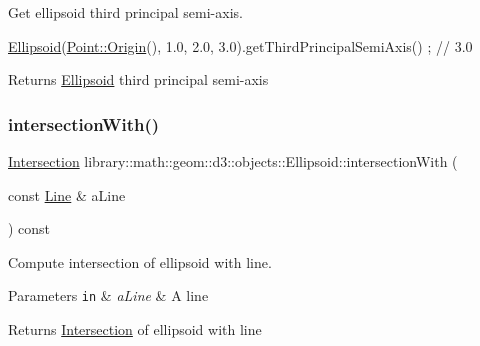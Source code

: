 Get ellipsoid third principal semi-\/axis. 


\begin{DoxyCode}
\hyperlink{classlibrary_1_1math_1_1geom_1_1d3_1_1objects_1_1_ellipsoid_aae81fe0edc7f0e8d4590ea89ae73cb14}{Ellipsoid}(\hyperlink{classlibrary_1_1math_1_1geom_1_1d3_1_1objects_1_1_point_ab2a38e285c562e50bf350272c083986f}{Point::Origin}(), 1.0, 2.0, 3.0).getThirdPrincipalSemiAxis() ; \textcolor{comment}{// 3.0}
\end{DoxyCode}


\begin{DoxyReturn}{Returns}
\hyperlink{classlibrary_1_1math_1_1geom_1_1d3_1_1objects_1_1_ellipsoid}{Ellipsoid} third principal semi-\/axis 
\end{DoxyReturn}
\mbox{\label{classlibrary_1_1math_1_1geom_1_1d3_1_1objects_1_1_ellipsoid_a5a043a5a0ad0c68771902824c9ea0190}} 
\subsubsection{\texorpdfstring{intersection\+With()}{intersectionWith()}\hspace{0.1cm}{\footnotesize\ttfamily [1/4]}}
{\footnotesize\ttfamily \hyperlink{classlibrary_1_1math_1_1geom_1_1d3_1_1_intersection}{Intersection} library\+::math\+::geom\+::d3\+::objects\+::\+Ellipsoid\+::intersection\+With (\begin{DoxyParamCaption}\item[{const \hyperlink{classlibrary_1_1math_1_1geom_1_1d3_1_1objects_1_1_line}{Line} \&}]{a\+Line }\end{DoxyParamCaption}) const}



Compute intersection of ellipsoid with line. 


\begin{DoxyParams}[1]{Parameters}
\mbox{\tt in}  & {\em a\+Line} & A line \\
\hline
\end{DoxyParams}
\begin{DoxyReturn}{Returns}
\hyperlink{classlibrary_1_1math_1_1geom_1_1d3_1_1_intersection}{Intersection} of ellipsoid with line 
\end{DoxyReturn}
\mbox{\label{classlibrary_1_1math_1_1geom_1_1d3_1_1objects_1_1_ellipsoid_a2a7c282ac6d4b54210582953e37c8ab5}} 
